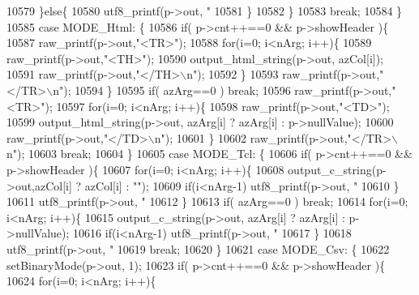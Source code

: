 \begin{DoxyCode}
{{{{{{{{{{{{{10579         \}\textcolor{keywordflow}{else}\{
10580           utf8_printf(p->out, \textcolor{stringliteral}{"%
10581         \}
10582       \}
10583       \textcolor{keywordflow}{break};
10584     \}
10585     \textcolor{keywordflow}{case} MODE_Html: \{
10586       \textcolor{keywordflow}{if}( p->cnt++==0 && p->showHeader )\{
10587         raw_printf(p->out,\textcolor{stringliteral}{"<TR>"});
10588         \textcolor{keywordflow}{for}(i=0; i<nArg; i++)\{
10589           raw_printf(p->out,\textcolor{stringliteral}{"<TH>"});
10590           output_html_string(p->out, azCol[i]);
10591           raw_printf(p->out,\textcolor{stringliteral}{"</TH>\(\backslash\)n"});
10592         \}
10593         raw_printf(p->out,\textcolor{stringliteral}{"</TR>\(\backslash\)n"});
10594       \}
10595       \textcolor{keywordflow}{if}( azArg==0 ) \textcolor{keywordflow}{break};
10596       raw_printf(p->out,\textcolor{stringliteral}{"<TR>"});
10597       \textcolor{keywordflow}{for}(i=0; i<nArg; i++)\{
10598         raw_printf(p->out,\textcolor{stringliteral}{"<TD>"});
10599         output_html_string(p->out, azArg[i] ? azArg[i] : p->nullValue);
10600         raw_printf(p->out,\textcolor{stringliteral}{"</TD>\(\backslash\)n"});
10601       \}
10602       raw_printf(p->out,\textcolor{stringliteral}{"</TR>\(\backslash\)n"});
10603       \textcolor{keywordflow}{break};
10604     \}
10605     \textcolor{keywordflow}{case} MODE_Tcl: \{
10606       \textcolor{keywordflow}{if}( p->cnt++==0 && p->showHeader )\{
10607         \textcolor{keywordflow}{for}(i=0; i<nArg; i++)\{
10608           output_c_string(p->out,azCol[i] ? azCol[i] : \textcolor{stringliteral}{""});
10609           \textcolor{keywordflow}{if}(i<nArg-1) utf8_printf(p->out, \textcolor{stringliteral}{"%
10610         \}
10611         utf8_printf(p->out, \textcolor{stringliteral}{"%
10612       \}
10613       \textcolor{keywordflow}{if}( azArg==0 ) \textcolor{keywordflow}{break};
10614       \textcolor{keywordflow}{for}(i=0; i<nArg; i++)\{
10615         output_c_string(p->out, azArg[i] ? azArg[i] : p->nullValue);
10616         \textcolor{keywordflow}{if}(i<nArg-1) utf8_printf(p->out, \textcolor{stringliteral}{"%
10617       \}
10618       utf8_printf(p->out, \textcolor{stringliteral}{"%
10619       \textcolor{keywordflow}{break};
10620     \}
10621     \textcolor{keywordflow}{case} MODE_Csv: \{
10622       setBinaryMode(p->out, 1);
10623       \textcolor{keywordflow}{if}( p->cnt++==0 && p->showHeader )\{
10624         \textcolor{keywordflow}{for}(i=0; i<nArg; i++)\{
}}}}}}}}}}}}}}}}}}
\end{DoxyCode}
